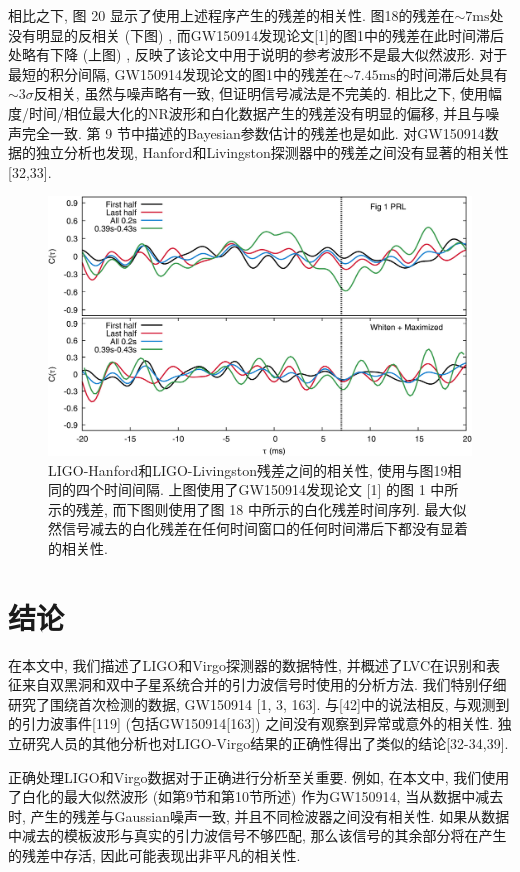 \documentclass[a4paper]{\documentclassname}
\def\t{\text}
\theoremstyle{definition}
\begin{document}
相比之下, 图 20 显示了使用上述程序产生的残差的相关性. 图18的残差在$\sim7 \t{ms}$处没有明显的反相关 (下图) , 而GW150914发现论文[1]的图1中的残差在此时间滞后处略有下降 (上图) , 反映了该论文中用于说明的参考波形不是最大似然波形. 对于最短的积分间隔, GW150914发现论文的图1中的残差在$\sim7.45 \t{ms}$的时间滞后处具有$\sim3 \sigma$反相关, 虽然与噪声略有一致, 但证明信号减法是不完美的. 相比之下, 使用幅度/时间/相位最大化的NR波形和白化数据产生的残差没有明显的偏移, 并且与噪声完全一致. 第 9 节中描述的Bayesian参数估计的残差也是如此. 对GW150914数据的独立分析也发现, Hanford和Livingston探测器中的残差之间没有显著的相关性[32,33]. 
\begin{figure}[htbp]
    \centering
    \includegraphics{img/20.jpg}
    \caption{
        LIGO-Hanford和LIGO-Livingston残差之间的相关性, 使用与图19相同的四个时间间隔. 上图使用了GW150914发现论文 [1] 的图 1 中所示的残差, 而下图则使用了图 18 中所示的白化残差时间序列. 最大似然信号减去的白化残差在任何时间窗口的任何时间滞后下都没有显着的相关性. 
    }
\end{figure}

\section{结论}

在本文中, 我们描述了LIGO和Virgo探测器的数据特性, 并概述了LVC在识别和表征来自双黑洞和双中子星系统合并的引力波信号时使用的分析方法. 我们特别仔细研究了围绕首次检测的数据, GW150914 [1,  3,  163]. 与[42]中的说法相反, 与观测到的引力波事件[119] (包括GW150914[163]) 之间没有观察到异常或意外的相关性. 独立研究人员的其他分析也对LIGO-Virgo结果的正确性得出了类似的结论[32-34,39]. 

正确处理LIGO和Virgo数据对于正确进行分析至关重要. 例如, 在本文中, 我们使用了白化的最大似然波形 (如第9节和第10节所述) 作为GW150914, 当从数据中减去时, 产生的残差与Gaussian噪声一致, 并且不同检波器之间没有相关性. 如果从数据中减去的模板波形与真实的引力波信号不够匹配, 那么该信号的其余部分将在产生的残差中存活, 因此可能表现出非平凡的相关性. 
\end{document}
